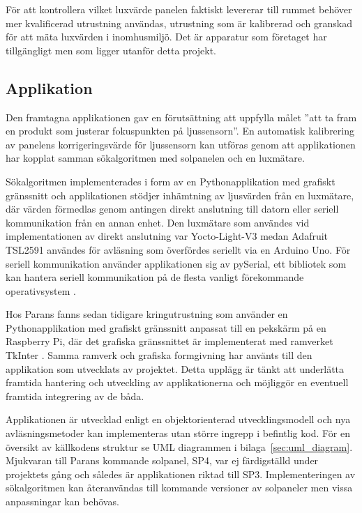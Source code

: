             För att kontrollera vilket luxvärde panelen faktiskt levererar till rummet behöver mer kvalificerad utrustning användas, utrustning som är kalibrerad och granskad för att mäta luxvärden i inomhusmiljö. Det är apparatur som företaget har tillgängligt men som ligger utanför detta projekt.

    \subsection{Applikation} %
    \label{sub:applikation}
        Den framtagna applikationen gav en förutsättning att uppfylla målet ''att ta fram en produkt som justerar fokuspunkten på ljussensorn''. En automatisk kalibrering av panelens korrigeringsvärde för ljussensorn kan utföras genom att applikationen har kopplat samman sökalgoritmen med solpanelen och en luxmätare.\bigskip

        Sökalgoritmen implementerades i form av en Pythonapplikation med grafiskt gränssnitt och applikationen stödjer inhämtning av ljusvärden från en luxmätare, där värden förmedlas genom antingen direkt anslutning till datorn eller seriell kommunikation från en annan enhet. Den luxmätare som användes vid implementationen av direkt anslutning var Yocto-Light-V3 medan Adafruit TSL2591 användes för avläsning som överfördes seriellt via en Arduino Uno. För seriell kommunikation använder applikationen sig av pySerial, ett bibliotek som kan hantera seriell kommunikation på de flesta vanligt förekommande operativsystem \cite{pyserial}. \bigskip

        Hos Parans fanns sedan tidigare kringutrustning som använder en Pythonapplikation med grafiskt gränssnitt anpassat till en pekskärm på en Raspberry Pi, där det grafiska gränssnittet är implementerat med ramverket TkInter \cite{solarremote}. Samma ramverk och grafiska formgivning har använts till den applikation som utvecklats av projektet. Detta upplägg är tänkt att underlätta framtida hantering och utveckling av applikationerna och möjliggör en eventuell framtida integrering av de båda. \bigskip

        Applikationen är utvecklad enligt en objektorienterad utvecklingsmodell och nya avläsningsmetoder kan implementeras utan större ingrepp i befintlig kod. För en översikt av källkodens struktur se UML diagrammen i bilaga~\ref{sec:uml_diagram}. Mjukvaran till Parans kommande solpanel, SP4, var ej färdigställd under projektets gång och således är applikationen riktad till SP3. Implementeringen av sökalgoritmen kan återanvändas till kommande versioner av solpaneler men vissa anpassningar kan behövas.
